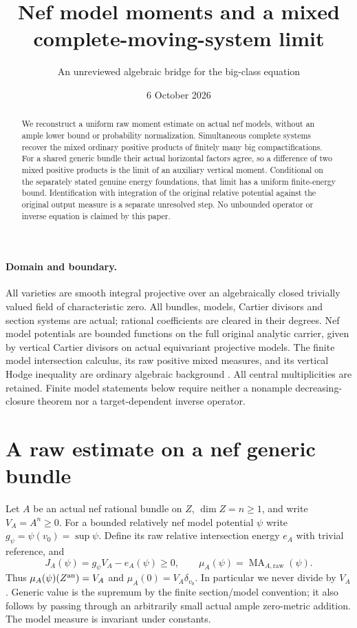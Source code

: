 \documentclass[10pt]{article}
\title{Nef model moments and a mixed complete-moving-system limit}
\author{An unreviewed algebraic bridge for the big-class equation}
\date{6 October 2026}
\newcommand{\MA}{\operatorname{MA}}
\begin{document}
\maketitle
\begin{abstract}
We reconstruct a uniform raw moment estimate on actual nef models,
without an ample lower bound or probability normalization. Simultaneous
complete systems recover the mixed ordinary positive products of finitely
many big compactifications. For a shared generic bundle their actual
horizontal factors agree, so a difference of two mixed positive products
is the limit of an auxiliary vertical moment. Conditional on
the separately stated genuine energy foundations, that limit has a
uniform finite-energy bound. Identification with integration of the
original relative potential against the original output measure is a
separate unresolved step. No unbounded operator or inverse equation is
claimed by this paper.
\end{abstract}

\paragraph{Domain and boundary.}
All varieties are smooth integral projective over an algebraically
closed trivially valued field of characteristic zero. All bundles,
models, Cartier divisors and section systems are actual; rational
coefficients are cleared in their degrees. Nef model potentials are
bounded functions on the full original analytic carrier, given by
vertical Cartier divisors on actual equivariant projective models.
The finite model intersection calculus, its raw positive mixed measures,
and its vertical Hodge inequality are ordinary algebraic background
\cite{BJ}. All central multiplicities are retained. Finite model
statements below require neither a nonample decreasing-closure theorem
nor a target-dependent inverse operator.

\section{A raw estimate on a nef generic bundle}
Let $A$ be an actual nef rational bundle on $Z$, $\dim Z=n\ge1$, and
write $V_A=A^n\ge0$. For a bounded relatively nef model potential
$\psi$ write $g_\psi=\psi(v_0)=\sup\psi$. Define its raw relative
intersection energy $e_A$ with trivial reference, and
\[
 J_A(\psi)=g_\psi V_A-e_A(\psi)\ge0,
 \qquad \mu_A(\psi)=\MA_{A,\mathrm{raw}}(\psi).
 \tag{1}
\]
Thus $\mu_A(\psi)(Z^{\rm an})=V_A$ and
$\mu_A(0)=V_A\delta_{v_0}$. In particular we never divide by $V_A$.
Generic value is the supremum by the finite section/model convention;
it also follows by passing through an arbitrarily small actual ample
zero-metric addition. The model measure is invariant under constants.
\end{document}
